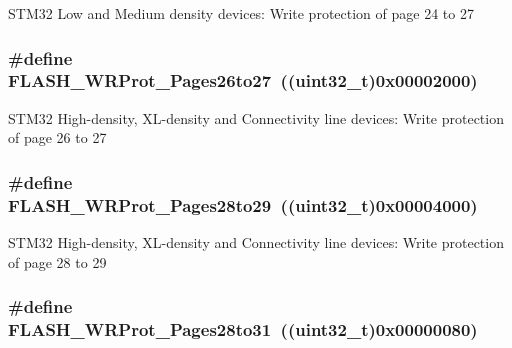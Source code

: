 STM32 Low and Medium density devices: Write protection of page 24 to 27 \hypertarget{group__Option__Bytes__Write__Protection_ga92c8a9f8b6875fccb072df795eff5e7e}{
\subsubsection[{FLASH\_\-WRProt\_\-Pages26to27}]{\setlength{\rightskip}{0pt plus 5cm}\#define FLASH\_\-WRProt\_\-Pages26to27~((uint32\_\-t)0x00002000)}}
\label{group__Option__Bytes__Write__Protection_ga92c8a9f8b6875fccb072df795eff5e7e}
STM32 High-\/density, XL-\/density and Connectivity line devices: Write protection of page 26 to 27 \hypertarget{group__Option__Bytes__Write__Protection_gae42c20bedcbaf926c7c49f51a7eea63f}{
\subsubsection[{FLASH\_\-WRProt\_\-Pages28to29}]{\setlength{\rightskip}{0pt plus 5cm}\#define FLASH\_\-WRProt\_\-Pages28to29~((uint32\_\-t)0x00004000)}}
\label{group__Option__Bytes__Write__Protection_gae42c20bedcbaf926c7c49f51a7eea63f}
STM32 High-\/density, XL-\/density and Connectivity line devices: Write protection of page 28 to 29 \hypertarget{group__Option__Bytes__Write__Protection_ga800860d071cfb40b1b0e94111a0cb549}{
\subsubsection[{FLASH\_\-WRProt\_\-Pages28to31}]{\setlength{\rightskip}{0pt plus 5cm}\#define FLASH\_\-WRProt\_\-Pages28to31~((uint32\_\-t)0x00000080)}}
\label{group__Option__Bytes__Write__Protection_ga800860d071cfb40b1b0e94111a0cb549}
